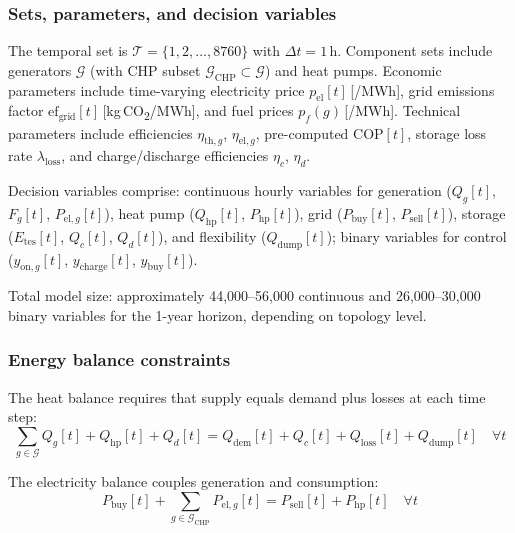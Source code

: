 \documentclass[a4paper,fleqn]{cas-dc}
\begin{document}
\subsubsection{Sets, parameters, and decision variables}

The temporal set is $\mathcal{T} = \{1, 2, \ldots, 8760\}$ with $\Delta t = 1$\,h. Component sets include generators $\mathcal{G}$ (with CHP subset $\mathcal{G}_\mathrm{CHP} \subset \mathcal{G}$) and heat pumps. Economic parameters include time-varying electricity price $p_\mathrm{el}[t]$\,[\EUR{}/MWh], grid emissions factor $\mathrm{ef}_\mathrm{grid}[t]$\,[kg\,CO\textsubscript{2}/MWh], and fuel prices $p_f(g)$\,[\EUR{}/MWh]. Technical parameters include efficiencies $\eta_{\mathrm{th},g}$, $\eta_{\mathrm{el},g}$, pre-computed COP$[t]$, storage loss rate $\lambda_\mathrm{loss}$, and charge/discharge efficiencies $\eta_c$, $\eta_d$.

Decision variables comprise: continuous hourly variables for generation ($Q_g[t]$, $F_g[t]$, $P_{\mathrm{el},g}[t]$), heat pump ($Q_\mathrm{hp}[t]$, $P_\mathrm{hp}[t]$), grid ($P_\mathrm{buy}[t]$, $P_\mathrm{sell}[t]$), storage ($E_\mathrm{tes}[t]$, $Q_c[t]$, $Q_d[t]$), and flexibility ($Q_\mathrm{dump}[t]$); binary variables for control ($y_{\mathrm{on},g}[t]$, $y_\mathrm{charge}[t]$, $y_\mathrm{buy}[t]$).

Total model size: approximately 44,000--56,000 continuous and 26,000--30,000 binary variables for the 1-year horizon, depending on topology level.

\subsubsection{Energy balance constraints}

The heat balance requires that supply equals demand plus losses at each time step:
\begin{equation}
\sum_{g \in \mathcal{G}} Q_g[t] + Q_\mathrm{hp}[t] + Q_d[t] = Q_\mathrm{dem}[t] + Q_c[t] + Q_\mathrm{loss}[t] + Q_\mathrm{dump}[t] \quad \forall t
\label{eq:heat_balance}
\end{equation}

The electricity balance couples generation and consumption:
\begin{equation}
P_\mathrm{buy}[t] + \sum_{g \in \mathcal{G}_\mathrm{CHP}} P_{\mathrm{el},g}[t] = P_\mathrm{sell}[t] + P_\mathrm{hp}[t] \quad \forall t
\label{eq:elec_balance}
\end{equation}
\end{document}
